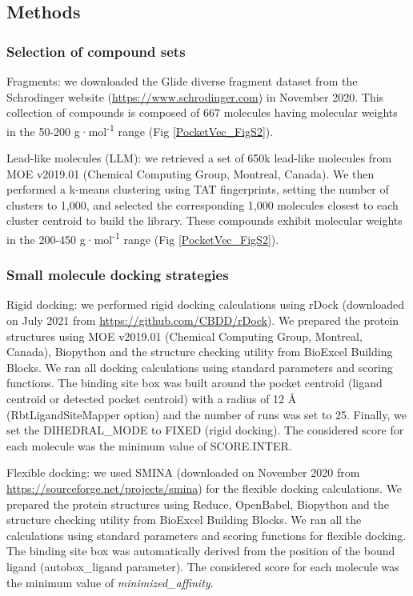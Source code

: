 \subsection{Methods}
\label{PocketVec_Methods}

\subsubsection{Selection of compound sets}

Fragments: we downloaded the Glide\cite{friesner_glide_2004, halgren_glide_2004} diverse fragment dataset from the Schrodinger website (\href{https://www.schrodinger.com}{https://www.schrodinger.com}) in November 2020. This collection of compounds is composed of 667 molecules having molecular weights in the 50-200 g·mol\textsuperscript{-1} range (Fig \ref{PocketVec_FigS2}).

Lead-like molecules (LLM): we retrieved a set of 650k lead-like molecules from MOE v2019.01 (Chemical Computing Group, Montreal, Canada). We then performed a k-means clustering using TAT fingerprints, setting the number of clusters to 1,000, and selected the corresponding 1,000 molecules closest to each cluster centroid to build the library. These compounds exhibit molecular weights in the 200-450 g·mol\textsuperscript{-1} range (Fig \ref{PocketVec_FigS2}). 

\subsubsection{Small molecule docking strategies}

Rigid docking: we performed rigid docking calculations using rDock\cite{ruiz-carmona_rdock_2014} (downloaded on July 2021 from \href{https://github.com/CBDD/rDock}{https://github.com/CBDD/rDock}). We prepared the protein structures using MOE v2019.01 (Chemical Computing Group, Montreal, Canada), Biopython\cite{cock_biopython_2009} and the structure checking utility from BioExcel Building Blocks\cite{andrio_bioexcel_2019}. We ran all docking calculations using standard parameters and scoring functions. The binding site box was built around the pocket centroid (ligand centroid or detected pocket centroid) with a radius of 12 Å (RbtLigandSiteMapper option) and the number of runs was set to 25. Finally, we set the DIHEDRAL\_MODE to FIXED (rigid docking). The considered score for each molecule was the minimum value of SCORE.INTER.

Flexible docking: we used SMINA\cite{koes_lessons_2013} (downloaded on November 2020 from \href{https://sourceforge.net/projects/smina}{https://sourceforge.net/projects/smina}) for the flexible docking calculations. We prepared the protein structures using Reduce\cite{word_asparagine_1999}, OpenBabel\cite{oboyle_open_2011}, Biopython\cite{cock_biopython_2009} and the structure checking utility from BioExcel Building Blocks\cite{andrio_bioexcel_2019}. We ran all the calculations using standard parameters and scoring functions for flexible docking. The binding site box was automatically derived from the position of the bound ligand (autobox\_ligand parameter). The considered score for each molecule was the minimum value of \textit{minimized\_affinity}. 


